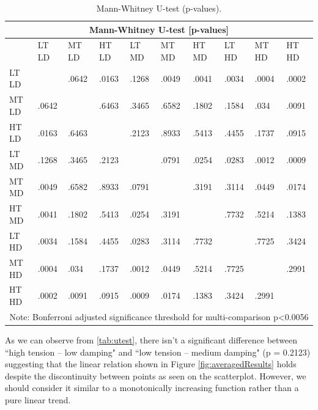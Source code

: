     \def \columnW {0.60cm}
    \begin{table}[t]
    \scriptsize
    \centering
    \begin{tabular}{ |p{0.9cm}||p{\columnW}|p{\columnW}|p{\columnW}|p{\columnW}|p{\columnW}|p{\columnW}|p{\columnW}|p{\columnW}|p{\columnW}|  }
     \hline
     \multicolumn{10}{|c|}{Mann-Whitney U-test [p-values]} \\
     \hline
      & LT LD & MT LD & HT LD & LT MD & MT MD & HT MD & LT HD & MT HD & HT HD \\
     \hline
    LT LD &	 &.0642 &.0163 &.1268 &.0049 &.0041 &.0034 &.0004 &.0002\\
    \hline
    MT LD &.0642 &	 &.6463 &.3465 &.6582 &.1802 &.1584 &.034 &.0091\\
    \hline
    HT LD &.0163 &.6463 &	 &.2123 &.8933 &.5413 &.4455 &.1737 &.0915\\
    \hline
    LT MD &.1268 &.3465 &.2123 &	 &.0791 &.0254 &.0283 &.0012 &.0009\\
    \hline
    MT MD &.0049 &.6582 &.8933 &.0791 &	 &.3191 &.3114 &.0449 &.0174\\
    \hline
    HT MD &.0041 &.1802 &.5413 &.0254 &.3191 &	 &.7732 &.5214 &.1383\\
    \hline
    LT HD &.0034 &.1584 &.4455 &.0283 &.3114 &.7732 &	 &.7725 &.3424\\
    \hline
    MT HD &.0004 &.034 &.1737 &.0012 &.0449 &.5214 &.7725 &	 &.2991\\
    \hline
    HT HD &.0002 &.0091 &.0915 &.0009 &.0174 &.1383 &.3424 &.2991 &	\\
    
     \hline
     \multicolumn{10}{|c|}{Note: Bonferroni adjusted significance threshold for multi-comparison p\textless0.0056} \\
     \hline
    \end{tabular}
    \caption{Mann-Whitney U-test (p-values).}
    \label{tab:utest}
    \end{table}
    
    As we can observe from \autoref{tab:utest}, there isn't a significant difference between ``high tension -- low damping" and ``low tension -- medium damping" (p = 0.2123) suggesting that the linear relation shown in Figure \ref{fig:averagedResults} holds despite the discontinuity between points as seen on the scatterplot. However, we should consider it similar to a monotonically increasing function rather than a pure linear trend. 
    
